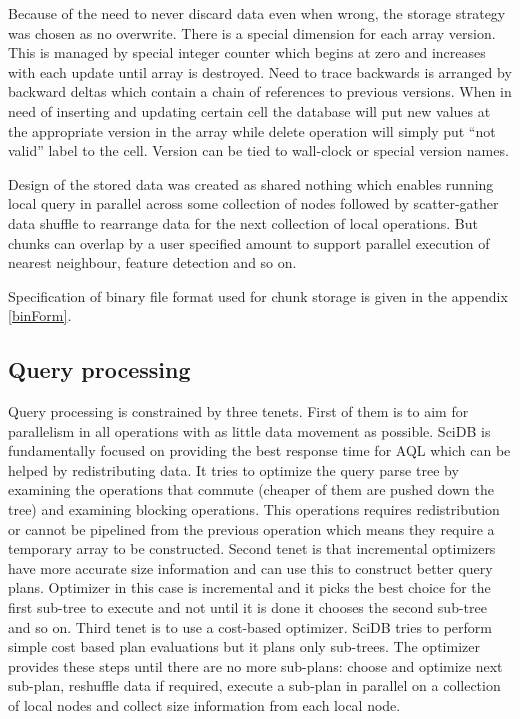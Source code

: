 Because of the need to never discard data even when wrong, the storage strategy was chosen as no overwrite. There is a special dimension for each array version. This is managed by special integer counter which begins at zero and increases with each update until array is destroyed. Need to trace backwards is arranged by backward deltas which contain a chain of references to previous versions. When in need of inserting and updating certain cell the database will put new values at the appropriate version in the array while delete operation will simply put ``not valid'' label to the cell. Version can be tied to wall-clock or special version names.

Design of the stored data was created as shared nothing which enables running local query in parallel across some collection of nodes followed by scatter-gather data shuffle to rearrange data for the next collection of local operations. But chunks can overlap by a user specified amount to support parallel execution of nearest neighbour, feature detection and so on.

Specification of binary file format used for chunk storage is given in the appendix \ref{binForm}.

\subsection{Query processing}

Query processing is constrained by three tenets.
First of them is to aim for parallelism in all operations with as little data movement as possible. SciDB is fundamentally focused on providing the best response time for AQL which can be helped by redistributing data. It tries to optimize the query parse tree by examining the operations that commute (cheaper of them are pushed down the tree) and examining blocking operations. This operations requires redistribution or cannot be pipelined from the previous operation which means they require a temporary array to be constructed.
Second tenet is that incremental optimizers have more accurate size information and can use this to construct better query plans. Optimizer in this case is incremental and it picks the best choice for the first sub-tree to execute and not until it is done it chooses the second sub-tree and so on.
Third tenet is to use a cost-based optimizer. SciDB tries to perform simple cost based plan evaluations but it plans only sub-trees. The optimizer provides these steps until there are no more sub-plans: choose and optimize next sub-plan, reshuffle data if required, execute a sub-plan in parallel on a collection of local nodes and collect size information from each local node.


